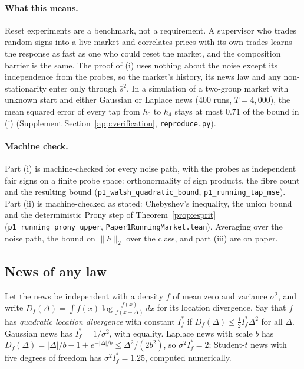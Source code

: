 \documentclass[12pt]{article}
\theoremstyle{definition}
\theoremstyle{remark}
\begin{document}
\paragraph{What this means.} Reset experiments are a benchmark, not a requirement. A supervisor who trades random signs into a live market and correlates prices with its own trades learns the response as fast as one who could reset the market, and the composition barrier is the same. The proof of (i) uses nothing about the noise except its independence from the probes, so the market's history, its news law and any non-stationarity enter only through $\bar s^2$. In a simulation of a two-group market with unknown start and either Gaussian or Laplace news (400 runs, $T=4{,}000$), the mean squared error of every tap from $h_0$ to $h_4$ stays at most $0.71$ of the bound in (i) (Supplement Section~\ref{app:verification}, \nolinkurl{reproduce.py}).

\paragraph{Machine check.} Part (i) is machine-checked for every noise path, with the probes as independent fair signs on a finite probe space: orthonormality of sign products, the fibre count and the resulting bound (\texttt{p1\_walsh\_quadratic\_bound}, \texttt{p1\_running\_tap\_mse}). Part (ii) is machine-checked as stated: Chebyshev's inequality, the union bound and the deterministic Prony step of Theorem~\ref{prop:esprit} (\texttt{p1\_running\_prony\_upper}, \nolinkurl{Paper1RunningMarket.lean}). Averaging over the noise path, the bound on $\|h\|_2$ over the class, and part (iii) are on paper.

\subsection{News of any law}

Let the news be independent with a density $f$ of mean zero and variance $\sigma^2$, and write $D_f(\Delta)=\int f(x)\log\frac{f(x)}{f(x-\Delta)}\,dx$ for its location divergence. Say that $f$ has \emph{quadratic location divergence} with constant $I^*_f$ if $D_f(\Delta)\le\frac12I^*_f\Delta^2$ for all $\Delta$. Gaussian news has $I^*_f=1/\sigma^2$, with equality. Laplace news with scale $b$ has $D_f(\Delta)=|\Delta|/b-1+e^{-|\Delta|/b}\le\Delta^2/(2b^2)$, so $\sigma^2I^*_f=2$; Student-$t$ news with five degrees of freedom has $\sigma^2I^*_f=1.25$, computed numerically.
\end{document}

